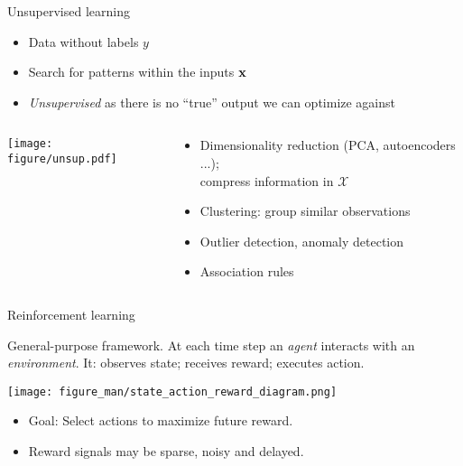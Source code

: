 \documentclass[11pt,compress,t,notes=noshow, xcolor=table]{beamer}
\begin{document}
\begin{vbframe}{Unsupervised learning}
\begin{itemize}
  \item Data without labels $y$
  \item Search for patterns within the inputs $\mathbf{x}$
  \item \textit{Unsupervised} as there is no ``true'' output
      we can optimize against
\end{itemize}

\lz

\begin{columns}
\begin{column}{0.45\textwidth}
\begin{center}
    \texttt{[image: figure/unsup.pdf]}
\end{center}
\end{column}
\begin{column}{0.55\textwidth}
\begin{itemize}
    \item Dimensionality reduction (PCA, autoencoders ...);\\ 
        compress information in $\mathcal X$
    \item Clustering: group similar observations
    \item Outlier detection, anomaly detection
    \item Association rules
\end{itemize}
\end{column}
\end{columns}
\end{vbframe}

\begin{vbframe}{Reinforcement learning}

General-purpose framework.
At each time step an \emph{agent} interacts with an \emph{environment}. 
It: observes state; receives reward; executes action.

\begin{center}
  \texttt{[image: figure\_man/state\_action\_reward\_diagram.png]}
\end{center}


\begin{itemize}
\item Goal: Select actions to maximize future reward.
\item Reward signals may be sparse, noisy and delayed.
\end{itemize}

\end{vbframe}
\end{document}
